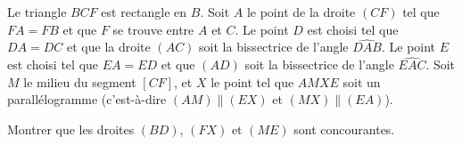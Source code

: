 Le triangle $BCF$ est rectangle en $B$. Soit $A$ le point de la droite $(CF)$ tel que $FA = FB$ et que $F$ se
trouve entre $A$ et $C$. Le point $D$ est choisi tel que $DA = DC$ et que la droite $(AC)$ soit la bissectrice
de l'angle $\widehat{DAB}$. Le point $E$ est choisi tel que $EA = ED$ et que $(AD)$ soit la bissectrice de
l'angle $\widehat{EAC}$. Soit $M$ le milieu du segment $[CF]$, et $X$ le point tel que $AMXE$ soit un
parallélogramme (c'est-à-dire $(AM) \parallel (EX)$ et $(MX) \parallel (EA)$).

Montrer que les droites $(BD)$, $(FX)$ et $(ME)$ sont concourantes.
